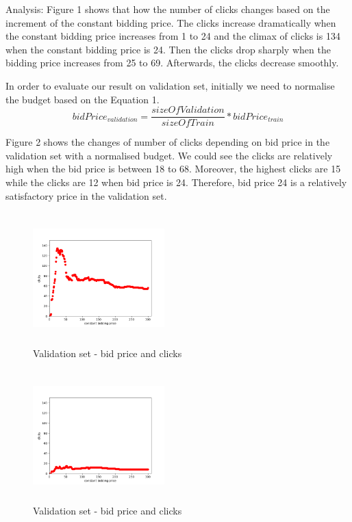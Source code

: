 \documentclass{sig-alternate-05-2015}
\begin{document}
Analysis: 
Figure 1 shows that how the number of clicks changes based on the increment of the constant bidding price.
The clicks increase dramatically when the constant bidding price increases from 1 to 24 and the climax of clicks is 134 when the constant bidding price is 24. Then the clicks drop sharply when the bidding price increases from 25 to 69. Afterwards, the clicks decrease smoothly.

In order to evaluate our result on validation set, initially we need to normalise the budget based on the Equation 1.\\

\begin{equation}bidPrice_{validation}=\frac{sizeOfValidation}{sizeOfTrain} * bidPrice_{train}\end{equation}


Figure 2 shows the changes of number of clicks depending on bid price in the validation set with a normalised budget. We could see the clicks are relatively high when the bid price is between 18 to 68. Moreover, the highest clicks are 15 while the clicks are 12 when bid price is 24. Therefore, bid price 24 is a relatively satisfactory price in the validation set.

\begin{figure}
\centering
\includegraphics[height=2in, width=2in]{images/constant_bidding.png}
\caption{Validation set - bid price and clicks}
\end{figure}

\begin{figure}
\centering
\includegraphics[height=2in, width=2in]{images/constant_bidding_validation.png}
\caption{Validation set - bid price and clicks}
\end{figure}
\end{document}
